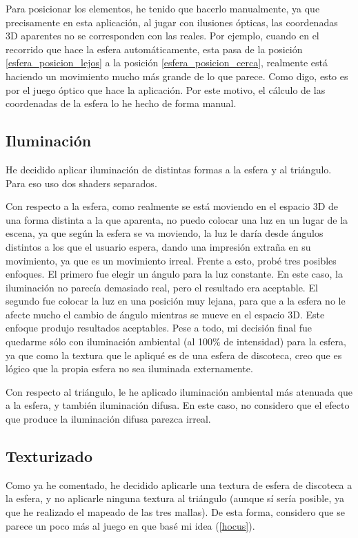 \documentclass[a4paper,12pt]{article}
\begin{document}
Para posicionar los elementos, he tenido que hacerlo manualmente, ya que precisamente en esta aplicación, al jugar con ilusiones ópticas, las coordenadas 3D aparentes no se corresponden con las reales. Por ejemplo, cuando en el recorrido que hace la esfera automáticamente, esta pasa de la posición \ref{esfera_posicion_lejos} a la posición \ref{esfera_posicion_cerca}, realmente está haciendo un movimiento mucho más grande de lo que parece. Como digo, esto es por el juego óptico que hace la aplicación. Por este motivo, el cálculo de las coordenadas de la esfera lo he hecho de forma manual.

\subsection{Iluminación}

He decidido aplicar iluminación de distintas formas a la esfera y al triángulo. Para eso uso dos shaders separados.

Con respecto a la esfera, como realmente se está moviendo en el espacio 3D de una forma distinta a la que aparenta, no puedo colocar una luz en un lugar de la escena, ya que según la esfera se va moviendo, la luz le daría desde ángulos distintos a los que el usuario espera, dando una impresión extraña en su movimiento, ya que es un movimiento irreal. Frente a esto, probé tres posibles enfoques. El primero fue elegir un ángulo para la luz constante. En este caso, la iluminación no parecía demasiado real, pero el resultado era aceptable. El segundo fue colocar la luz en una posición muy lejana, para que a la esfera no le afecte mucho el cambio de ángulo mientras se mueve en el espacio 3D. Este enfoque produjo resultados aceptables. Pese a todo, mi decisión final fue quedarme sólo con iluminación ambiental (al 100\% de intensidad) para la esfera, ya que como la textura que le apliqué es de una esfera de discoteca, creo que es lógico que la propia esfera no sea iluminada externamente.

Con respecto al triángulo, le he aplicado iluminación ambiental más atenuada que a la esfera, y también iluminación difusa. En este caso, no considero que el efecto que produce la iluminación difusa parezca irreal.

\subsection{Texturizado} \label{texturizado}

Como ya he comentado, he decidido aplicarle una textura de esfera de discoteca a la esfera, y no aplicarle ninguna textura al triángulo (aunque sí sería posible, ya que he realizado el mapeado de las tres mallas). De esta forma, considero que se parece un poco más al juego en que basé mi idea (\ref{hocus}).
\end{document}
